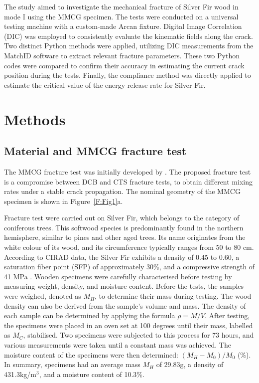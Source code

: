 \documentclass[3p,times,procedia]{elsarticle}
\begin{document}
The study aimed to investigate the mechanical fracture of Silver Fir wood in mode I using the MMCG specimen. The tests were conducted on a universal testing machine with a custom-made Arcan fixture. Digital Image Correlation (DIC) was employed to consistently evaluate the kinematic fields along the crack. Two distinct Python methods were applied, utilizing DIC measurements from the MatchID software to extract relevant fracture parameters. These two Python codes were compared to confirm their accuracy in estimating the current crack position during the tests. Finally, the compliance method was directly applied to estimate the critical value of the energy release rate for Silver Fir.

\section{Methods}\label{S:method}

\subsection{Material and MMCG fracture test}\label{Ss:spec}

The MMCG fracture test was initially developed by \citet{MoutouPitti2008}. The proposed fracture test is a compromise between DCB and CTS fracture tests, to obtain different mixing rates under a stable crack propagation. The nominal geometry of the MMCG specimen is shown in Figure~\ref{F:Fig1}a.


Fracture test were carried out on Silver Fir, which belongs to the category of coniferous trees. This softwood species is predominantly found in the northern hemisphere, similar to pines and other aged trees. Its name originates from the white colour of its wood, and its circumference typically ranges from 50 to 80 cm. According to CIRAD data, the Silver Fir exhibits a density of 0.45 to 0.60, a saturation fiber point (SFP) of approximately 30\%, and a compressive strength of 41 MPa \citep{Angellier2017}. Wooden specimens were carefully characterised before testing by measuring weight, density, and moisture content. Before the tests, the samples were weighed, denoted as $M_H$, to determine their mass during testing. The wood density can also be derived from the sample's volume and mass. The density of each sample can be determined by applying the formula $\rho = M/V$.
After testing, the specimens were placed in an oven set at 100 degrees until their mass, labelled as $M_C$, stabilised. Two specimens were subjected to this process for 73 hours, and various measurements were taken until a constant mass was achieved. The moisture content of the specimens were then determined: $(M_{H}-M_{0})/M_{0}$ (\%). In summary, specimens had an average mass $M_H$ of 29.83g, a density of 431.3kg/m$^3$, and a moisture content of 10.3\%.
\end{document}
